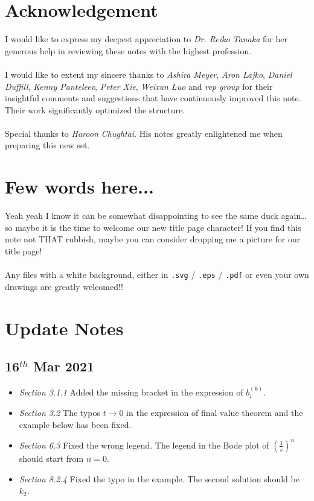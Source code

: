 \documentclass[12pt,a4paper]{article}
\begin{document}
\newpage
\section*{Acknowledgement}
I would like to express my deepest appreciation to \emph{Dr. Reiko Tanaka} for her generous help in reviewing these notes with the highest profession.
\ \\ \\
I would like to extent my sincere thanks to \emph{Ashira Meyer}, \emph{Aron Lajko}, \emph{Daniel Duffill}, \emph{Kenny Panteleev}, \emph{Peter Xie}, \emph{Weixun Luo} and \emph{rep group} for their insightful comments and suggestions that have continuously improved this note. Their work significantly optimized the structure. 
\ \\ \\
Special thanks to \emph{Haroon Chughtai}. His notes greatly enlightened me when preparing this new set.
\\
\section*{Few words here...}
Yeah yeah I know it can be somewhat disappointing to see the same duck again… so maybe it is the time to welcome our new title page character! If you find this note not THAT rubbish, maybe you can consider dropping me a picture for our title page! \\\\
Any files with a white background, either in \texttt{.svg} / \texttt{.eps} / \texttt{.pdf} or even your own drawings are greatly welcomed!!
\\
\section*{Update Notes}
\subsection*{16$^{th}$ Mar 2021}
\begin{itemize}
\item  \textit{Section 3.1.1} \quad Added the missing bracket in the expression of $b_{i}^{(k)}$.
\item \textit{Section 3.2} \quad The typos $t \to 0$ in the expression of final value theorem and the example below has been fixed. 
\item \textit{Section 6.3} \quad Fixed the wrong legend. The legend in the Bode plot of $(\frac{1}{s})^{n}$ should start from $n=0$.
\item  \textit{Section 8.2.4} \quad Fixed the typo in the example. The second solution should be  $k_{2}$.
\end{itemize}
\end{document}
